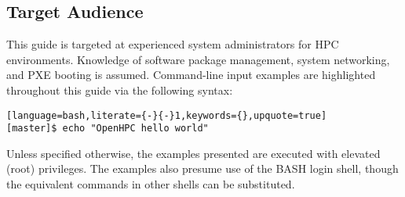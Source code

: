 \subsection{Target Audience}

This guide is targeted at experienced \Linux{} system administrators for HPC
environments. Knowledge of software package management, system networking, and
PXE booting is assumed.  Command-line input examples are highlighted throughout
this guide via the following syntax:

\begin{lstlisting}[language=bash,literate={-}{-}1,keywords={},upquote=true]
[master]$ echo "OpenHPC hello world"
\end{lstlisting}

Unless specified otherwise, the examples presented are executed with
elevated (root) privileges. The examples also presume use of the BASH login
shell, though the equivalent commands in other shells can be substituted.
